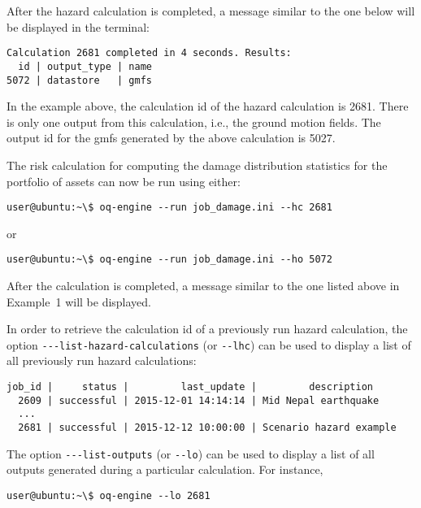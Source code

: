 After the hazard calculation is completed, a message similar to the one below
will be displayed in the terminal:

\begin{verbatim}
Calculation 2681 completed in 4 seconds. Results:
  id | output_type | name
5072 | datastore   | gmfs
\end{verbatim}

In the example above, the calculation id of the hazard calculation is 2681.
There is only one output from this calculation, i.e., the ground motion
fields. The output id for the gmfs generated by the above calculation is 5027.

The risk calculation for computing the damage distribution statistics for the
portfolio of assets can now be run using either:

\begin{verbatim}
user@ubuntu:~\$ oq-engine --run job_damage.ini --hc 2681
\end{verbatim}

or

\begin{verbatim}
user@ubuntu:~\$ oq-engine --run job_damage.ini --ho 5072
\end{verbatim}

After the calculation is completed, a message similar to the one listed above
in Example~1 will be displayed.

In order to retrieve the calculation id of a previously run hazard calculation,
the option \Verb+---list-hazard-calculations+ (or \Verb+--lhc+) can be used to
display a list of all previously run hazard calculations:

\begin{verbatim}
job_id |     status |         last_update |         description
  2609 | successful | 2015-12-01 14:14:14 | Mid Nepal earthquake
  ...
  2681 | successful | 2015-12-12 10:00:00 | Scenario hazard example
\end{verbatim}

The option \Verb+---list-outputs+ (or \Verb+--lo+) can be used to display a
list of all outputs generated during a particular calculation. For instance,

\begin{verbatim}
user@ubuntu:~\$ oq-engine --lo 2681
\end{verbatim}

